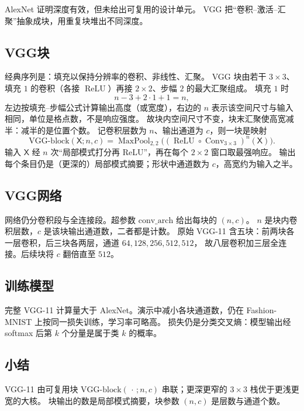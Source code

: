

AlexNet 证明深度有效，但未给出可复用的设计单元。
VGG 把“卷积--激活--汇聚”抽象成块，用重复块堆出不同深度。

\subsection{VGG块}

经典序列是：填充以保持分辨率的卷积、非线性、汇聚。
VGG 块由若干 $3\times 3$、填充 $1$ 的卷积（各接 $\operatorname{ReLU}$）再接 $2\times 2$、步幅 $2$ 的最大汇聚组成。
填充 $1$ 时
\[
n-3+2\cdot 1+1=n,
\]
左边按填充--步幅公式计算输出高度（或宽度），右边的 $n$ 表示该空间尺寸与输入相同，单位是格点数，不是响应强度。
故块内空间尺寸不变，块末汇聚使高宽减半：减半的是位置个数。
记卷积层数为 $n$、输出通道为 $c$，则一块是映射
\[
\mathrm{VGG\text{-}block}(\mathsf{X};n,c)
=
\operatorname{MaxPool}_{2,2}\bigl((\operatorname{ReLU}\circ\operatorname{Conv}_{3\times 3})^{n}(\mathsf{X})\bigr).
\]
输入 $\mathsf{X}$ 经 $n$ 次“局部模式打分再 ReLU”，再在每个 $2\times 2$ 窗口取最强响应。
输出每个条目仍是（更深的）局部模式摘要；形状中通道数为 $c$，高宽约为输入之半。

\subsection{VGG网络}

网络仍分卷积段与全连接段。超参数 $\mathrm{conv\_arch}$ 给出每块的 $(n,c)$。
$n$ 是块内卷积层数，$c$ 是该块输出通道数，二者都是计数。
原始 VGG-11 含五块：前两块各一层卷积，后三块各两层，通道 $64,128,256,512,512$，
故八层卷积加三层全连接。后续块将 $c$ 翻倍直至 $512$。

\subsection{训练模型}

完整 VGG-11 计算量大于 AlexNet。演示中减小各块通道数，仍在 Fashion-MNIST 上按同一损失训练，学习率可略高。
损失仍是分类交叉熵：模型输出经 softmax 后第 $k$ 个分量是属于类 $k$ 的概率。

\subsection{小结}

VGG-11 由可复用块 $\mathrm{VGG\text{-}block}(\,\cdot\,;n,c)$ 串联；更深更窄的 $3\times 3$ 栈优于更浅更宽的大核。
块输出的数是局部模式摘要，块参数 $(n,c)$ 是层数与通道个数。

